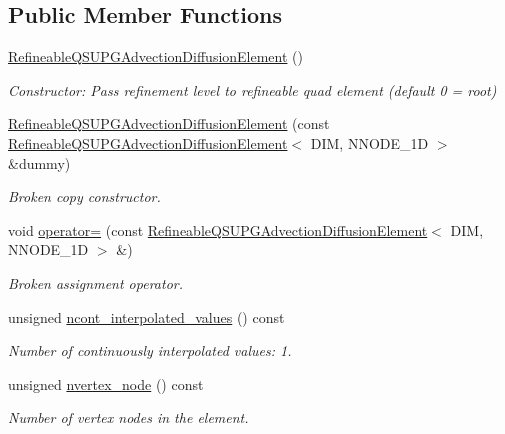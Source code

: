 \subsection*{Public Member Functions}
\begin{DoxyCompactItemize}
\item 
\hyperlink{classoomph_1_1RefineableQSUPGAdvectionDiffusionElement_ac8e2bbbe03bcbe7022a84a4e1c670c59}{Refineable\+Q\+S\+U\+P\+G\+Advection\+Diffusion\+Element} ()
\begin{DoxyCompactList}\small\item\em Constructor\+: Pass refinement level to refineable quad element (default 0 = root) \end{DoxyCompactList}\item 
\hyperlink{classoomph_1_1RefineableQSUPGAdvectionDiffusionElement_ab1a671b5e856264a05cd4b46aee97da6}{Refineable\+Q\+S\+U\+P\+G\+Advection\+Diffusion\+Element} (const \hyperlink{classoomph_1_1RefineableQSUPGAdvectionDiffusionElement}{Refineable\+Q\+S\+U\+P\+G\+Advection\+Diffusion\+Element}$<$ D\+IM, N\+N\+O\+D\+E\+\_\+1D $>$ \&dummy)
\begin{DoxyCompactList}\small\item\em Broken copy constructor. \end{DoxyCompactList}\item 
void \hyperlink{classoomph_1_1RefineableQSUPGAdvectionDiffusionElement_afe5efb61f47581db3f26b34c40d230f6}{operator=} (const \hyperlink{classoomph_1_1RefineableQSUPGAdvectionDiffusionElement}{Refineable\+Q\+S\+U\+P\+G\+Advection\+Diffusion\+Element}$<$ D\+IM, N\+N\+O\+D\+E\+\_\+1D $>$ \&)
\begin{DoxyCompactList}\small\item\em Broken assignment operator. \end{DoxyCompactList}\item 
unsigned \hyperlink{classoomph_1_1RefineableQSUPGAdvectionDiffusionElement_ac95d2278e21e486b84d50c086d453dcd}{ncont\+\_\+interpolated\+\_\+values} () const
\begin{DoxyCompactList}\small\item\em Number of continuously interpolated values\+: 1. \end{DoxyCompactList}\item 
unsigned \hyperlink{classoomph_1_1RefineableQSUPGAdvectionDiffusionElement_a7cd6f311a712fba0bf53a148cd737d1b}{nvertex\+\_\+node} () const
\begin{DoxyCompactList}\small\item\em Number of vertex nodes in the element. \end{DoxyCompactList}\item 

\end{DoxyCompactItemize}
